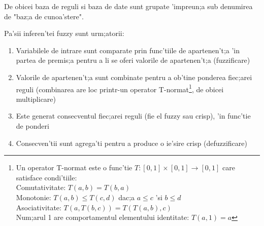 De obicei baza de reguli si baza de date sunt grupate 'impreun;a sub denumirea de "baz;a de cunoa'stere".
\par \newpage
Pa'sii inferen'tei fuzzy sunt urm;atorii:
\begin{enumerate}
\item Variabilele de intrare sunt comparate prin func'tiile de apartenen't;a 'in partea de premis;a pentru a li se oferi valorile de apartenen't;a (fuzzificare)
\item Valorile de apartenen't;a sunt combinate pentru a ob'tine ponderea fiec;arei reguli (combinarea are loc printr-un operator T-normat\footnote{Un operator T-normat este o func'tie $T: [0,1] \times [0, 1] \to [0, 1]$ care satisface condi'tiile: \\
Comutativitate: $T(a, b) = T(b, a)$ \\
Monotonie: $T(a, b) \leq T(c, d)$ dac;a $a \leq c$ 'si $b \leq d$ \\
Asociativitate: $T(a, T(b, c)) = T(T(a, b), c)$ \\
Num;arul 1 are comportamentul elementului identitate: $T(a, 1) = a$}, de obicei multiplicare)
\item Este generat consecventul fiec;arei reguli (fie el fuzzy sau crisp), 'in func'tie de ponderi
\item Consecven'tii sunt agrega'ti pentru a produce o ie'sire crisp (defuzzificare)
\end{enumerate}
\par
